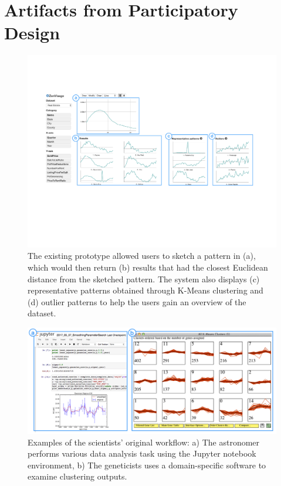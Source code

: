\appendix
\section{Artifacts from Participatory Design\label{apdx:pdartifact}}
\begin{figure}[H]
	\centering
	\includegraphics[width=\linewidth]{figures/oldZV_nozql.pdf}
	\caption{The existing \zv prototype allowed users to sketch a pattern in (a), which would then return (b) results that had the closest Euclidean distance from the sketched pattern. The system also displays (c) representative patterns obtained through K-Means clustering and (d) outlier patterns to help the users gain an overview of the dataset.}
	\label{oldZV}
	\end{figure}
\begin{figure}[H]
  \centering
  \includegraphics[width=\linewidth]{figures/workflow.png}
  \caption{Examples of the scientists' original workflow: a) The astronomer performs various data analysis task using the Jupyter notebook environment, b) The geneticists uses a domain-specific software to examine clustering outputs.}
  \label{workflow}
\end{figure}
